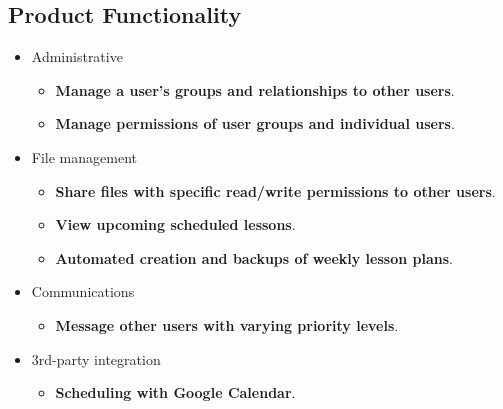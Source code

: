     \subsection{Product Functionality}\label{sec:product-functionality}
        \begin{itemize}
            \item Administrative
            \begin{itemize}
                \item \textbf{Manage a user's groups and relationships to other users}.
                \item \textbf{Manage permissions of user groups and individual users}.
            \end{itemize}
            \item File management
            \begin{itemize}                
                \item \textbf{Share files with specific read/write permissions to other users}.
                \item \textbf{View upcoming scheduled lessons}.
                \item \textbf{Automated creation and backups of weekly \glspl{lesson plan}}.
            \end{itemize}
            \item Communications
            \begin{itemize}
                \item \textbf{Message other users with varying priority levels}.
            \end{itemize}
            \item 3rd-party integration
            \begin{itemize}                
                \item \textbf{Scheduling with Google Calendar}.
            \end{itemize}
        \end{itemize}
